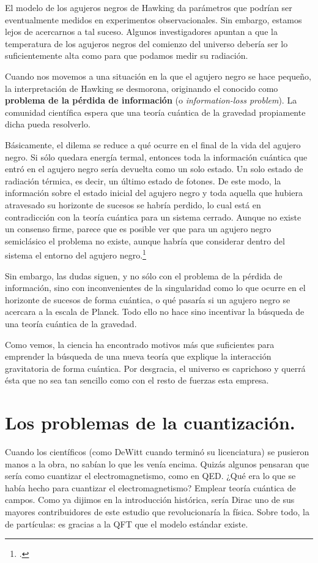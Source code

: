 \documentclass[11pt,a4paper,titlepage]{article}
\begin{document}
\begin{description}
{  El modelo de los agujeros negros de Hawking da parámetros que podrían ser eventualmente medidos en experimentos observacionales. Sin embargo, estamos lejos de acercarnos a tal suceso. Algunos investigadores apuntan a que la temperatura de los agujeros negros del comienzo del universo debería ser lo suficientemente alta como para que podamos medir su radiación.

  Cuando nos movemos a una situación en la que el agujero negro se hace pequeño, la interpretación de Hawking se desmorona, originando el conocido como \textbf{problema de la pérdida de información} (o \textit{information-loss problem}). La comunidad científica espera que una teoría cuántica de la gravedad propiamente dicha pueda resolverlo.

  Básicamente, el dilema se reduce a qué ocurre en el final de la vida del agujero negro. Si sólo quedara energía termal, entonces toda la información cuántica que entró en el agujero negro sería devuelta como un solo estado. Un solo estado de radiación térmica, es decir, un último estado de fotones. De este modo, la información sobre el estado inicial del agujero negro y toda aquella que hubiera atravesado su horizonte de sucesos se habría perdido, lo cual está en contradicción con la teoría cuántica para un sistema cerrado. Aunque no existe un consenso firme, parece que es posible ver que para un agujero negro semiclásico el problema no existe, aunque habría que considerar dentro del sistema el entorno del agujero negro.\footnote{\cite[p.~4]{paper_osorio}.}

  Sin embargo, las dudas siguen, y no sólo con el problema de la pérdida de información, sino con inconvenientes de la singularidad como lo que ocurre en el horizonte de sucesos de forma cuántica, o qué pasaría si un agujero negro se acercara a la escala de Planck. Todo ello no hace sino incentivar la búsqueda de una teoría cuántica de la gravedad.}

\end{description}

Como vemos, la ciencia ha encontrado motivos más que suficientes para emprender la búsqueda de una nueva teoría que explique la interacción gravitatoria de forma cuántica. Por desgracia, el universo es caprichoso y querrá ésta que no sea tan sencillo como con el resto de fuerzas esta empresa.
%
%
%
%
\newpage
\section{Los problemas de la cuantización.}
Cuando los científicos (como DeWitt cuando terminó su licenciatura) se pusieron manos a la obra, no sabían lo que les venía encima. Quizás algunos pensaran que sería como cuantizar el electromagnetismo, como en QED. ¿Qué era lo que se había hecho para cuantizar el electromagnetismo? Emplear teoría cuántica de campos. Como ya dijimos en la introducción histórica, sería Dirac uno de sus mayores contribuidores de este estudio que revolucionaría la física. Sobre todo, la de partículas: es gracias a la QFT que el modelo estándar existe.
\end{document}
